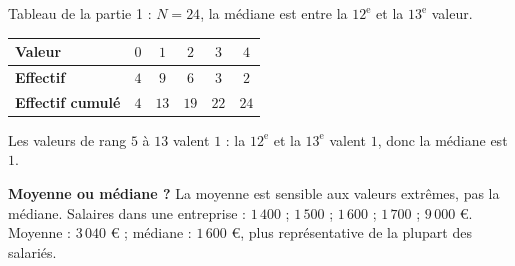 \documentclass[11pt]{article}
\begin{document}
\begin{exemple}
Tableau de la partie 1 : $N = 24$, la médiane est entre la $12^\text{e}$ et la $13^\text{e}$ valeur.
\begin{center}
\renewcommand{\arraystretch}{1.3}
\begin{tabular}{|l|c|c|c|c|c|}
\hline
\textbf{Valeur} & $0$ & $1$ & $2$ & $3$ & $4$ \\ \hline
\textbf{Effectif} & $4$ & $9$ & $6$ & $3$ & $2$ \\ \hline
\textbf{Effectif cumulé} & $4$ & $13$ & $19$ & $22$ & $24$ \\ \hline
\end{tabular}
\end{center}
Les valeurs de rang $5$ à $13$ valent $1$ : la $12^\text{e}$ et la $13^\text{e}$ valent $1$, donc la médiane est $1$.
\end{exemple}

\begin{remarque}
\textbf{Moyenne ou médiane ?} La moyenne est sensible aux valeurs extrêmes, pas la médiane.
Salaires dans une entreprise : $1\,400$ ; $1\,500$ ; $1\,600$ ; $1\,700$ ; $9\,000$ €.
Moyenne : $3\,040$ € ; médiane : $1\,600$ €, plus représentative de la plupart des salariés.
\end{remarque}
\end{document}
